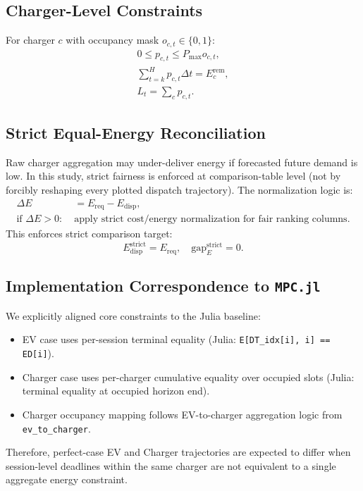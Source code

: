 \documentclass[journal]{IEEEtran}
\begin{document}
\subsection{Charger-Level Constraints}
For charger $c$ with occupancy mask $o_{c,t}\in\{0,1\}$:
\begin{align}
0\le p_{c,t}\le P_{\max}o_{c,t},\\
\sum_{t=k}^{H} p_{c,t}\Delta t = E_c^{\mathrm{rem}},\\
L_t=\sum_c p_{c,t}.
\end{align}

\subsection{Strict Equal-Energy Reconciliation}
Raw charger aggregation may under-deliver energy if forecasted future demand is low. In this study, strict fairness is enforced at comparison-table level (not by forcibly reshaping every plotted dispatch trajectory). The normalization logic is:
\begin{align}
\Delta E &= E_{\mathrm{req}}-E_{\mathrm{disp}},\\
\text{if }\Delta E>0: \;&\text{apply strict cost/energy normalization for fair ranking columns.}
\end{align}
This enforces strict comparison target:
\begin{equation}
E_{\mathrm{disp}}^{\mathrm{strict}}=E_{\mathrm{req}},\quad \mathrm{gap}_E^{\mathrm{strict}}=0.
\end{equation}

\subsection{Implementation Correspondence to \texttt{MPC.jl}}
We explicitly aligned core constraints to the Julia baseline:
\begin{itemize}
    \item EV case uses per-session terminal equality (Julia: \texttt{E[DT\_idx[i], i] == ED[i]}).
    \item Charger case uses per-charger cumulative equality over occupied slots (Julia: terminal equality at occupied horizon end).
    \item Charger occupancy mapping follows EV-to-charger aggregation logic from \texttt{ev\_to\_charger}.
\end{itemize}
Therefore, perfect-case EV and Charger trajectories are expected to differ when session-level deadlines within the same charger are not equivalent to a single aggregate energy constraint.
\end{document}
